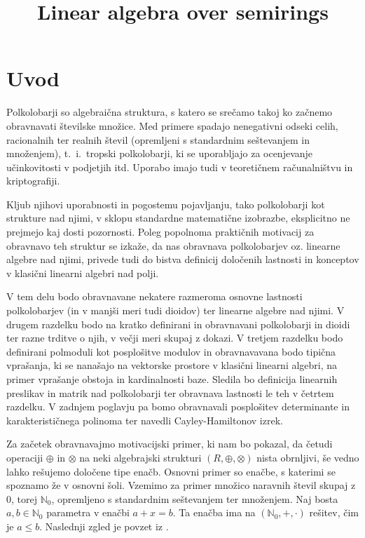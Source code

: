 \documentclass[mat1]{fmfdelo}
\title{Linear algebra over semirings}
\newcommand{\N}{\mathbb{N}}
\newcommand{\No}{\N_0}
\begin{document}

\tableofcontents

\section{Uvod}\label{sect:intro}
Polkolobarji so algebraična struktura, s katero se srečamo takoj ko začnemo obravnavati številske množice. Med primere spadajo nenegativni odseki celih, racionalnih ter realnih števil (opremljeni s standardnim seštevanjem in množenjem), t.~i.~tropski polkolobarji, ki se uporabljajo za ocenjevanje učinkovitosti v podjetjih itd. Uporabo imajo tudi v teoretičnem računalništvu in kriptografiji. 

Kljub njihovi uporabnosti in pogostemu pojavljanju, tako polkolobarji kot strukture nad njimi, v sklopu standardne matematične izobrazbe, eksplicitno ne prejmejo kaj dosti pozornosti. Poleg popolnoma praktičnih motivacij za obravnavo teh struktur se izkaže, da nas obravnava polkolobarjev oz. linearne algebre nad njimi, privede tudi do bistva definicij določenih lastnosti in konceptov v klasični linearni algebri nad polji. 

V tem delu bodo obravnavane nekatere razmeroma osnovne lastnosti polkolobarjev (in v manjši meri tudi dioidov) ter linearne algebre nad njimi. V drugem razdelku bodo na kratko definirani in obravnavani polkolobarji in dioidi ter razne trditve o njih, v večji meri skupaj z dokazi. V tretjem razdelku bodo definirani polmoduli kot posplošitve modulov in obravnavavana bodo tipična vprašanja, ki se nanašajo na vektorske prostore v klasični linearni algebri, na primer vprašanje obstoja in kardinalnosti baze. Sledila bo definicija linearnih preslikav in matrik nad polkolobarji ter obravnava lastnosti le teh v četrtem razdelku. V zadnjem poglavju pa bomo obravnavali posplošitev determinante in karakterističnega polinoma ter navedli Cayley-Hamiltonov izrek.

Za začetek obravnavajmo motivacijski primer, ki nam bo pokazal, da četudi operaciji $\oplus$ in $\otimes$ na neki algebrajski strukturi $(R, \oplus, \otimes)$ nista obrnljivi, še vedno lahko rešujemo določene tipe enačb. Osnovni primer so enačbe, s katerimi se spoznamo že v osnovni šoli. Vzemimo za primer množico naravnih števil skupaj z $0$, torej $\No$, opremljeno s standardnim seštevanjem ter množenjem. Naj bosta $a, b\in \No$ parametra v enačbi $a + x = b$. Ta enačba ima na $(\No, +, \cdot)$ rešitev, čim je $a \leq b$. Naslednji zgled je povzet iz \cite[str. 1 -- 2]{bib:Gondran}.
\end{document}
